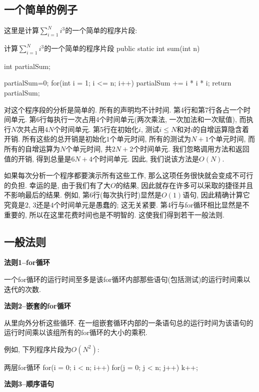 \documentclass[oneside]{ctexbook}
\begin{document}
{\subsection{一个简单的例子}

这里是计算$\sum_{i=1}^{N}i^3$的一个简单的程序片段:

\begin{myjava}{}{计算$\sum_{i=1}^{N}i^3$的一个简单的程序片段}
public static int sum(int n) {
    int partialSum;

    partialSum=0;
    for(int i = 1; i <= n; i++)
        partialSum += i * i * i;
    return partialSum;
}
\end{myjava}

对这个程序段的分析是简单的. 所有的声明均不计时间. 第4行和第7行各占一个时间单元. 第6行每执行一次占用4个时间单元(两次乘法, 一次加法和一次赋值), 而执行$N$次共占用$4N$个时间单元. 第5行在初始化$i$, 测试$i\leq N$和对$i$的自增运算隐含着开销. 所有这些的总开销是初始化$1$个单元时间, 所有的测试为$N+1$个单元时间, 而所有的自增运算为$N$个单元时间, 共$2N+2$个时间单元. 我们忽略调用方法和返回值的开销, 得到总量是$6N+4$个时间单元. 因此, 我们说该方法是$O(N)$.

如果每次分析一个程序都要演示所有这些工作, 那么这项任务很快就会变成不可行的负担. 幸运的是, 由于我们有了大$O$的结果, 因此就存在许多可以采取的捷径并且不影响最后的结果. 例如, 第6行(每次执行时)显然是$O(1)$语句, 因此精确计算它究竟是$2$, $3$还是$4$个时间单元是愚蠢的; 这无关紧要. 第4行与for循环相比显然是不重要的, 所以在这里花费时间也是不明智的. 这使我们得到若干一般法则.

\subsection{一般法则}

\textbf{法则1--for循环}

一个for循环的运行时间至多是该for循环内部那些语句(包括测试)的运行时间乘以迭代的次数.

\textbf{法则2--嵌套的for循环}

从里向外分析这些循环. 在一组嵌套循环内部的一条语句总的运行时间为该语句的运行时间乘以该组所有的for循环的大小的乘积.

例如, 下列程序片段为$O(N^2)$:

\begin{myjava}{}{两层for循环}
for(i = 0; i < n; i++)
    for(j = 0; j < n; j++)
        k++;
\end{myjava}

\textbf{法则3--顺序语句}

}
\end{document}
